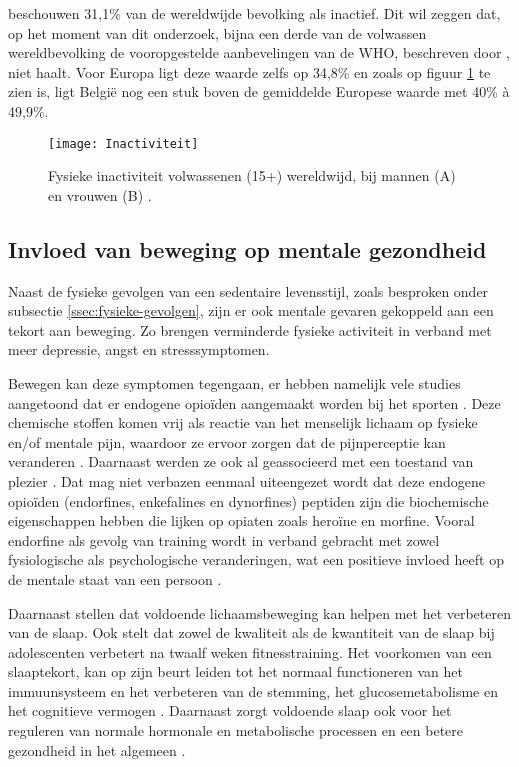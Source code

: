 \textcite{Hallal2012} beschouwen 31,1\% van de wereldwijde bevolking als inactief. Dit wil zeggen dat, op het moment van dit onderzoek, bijna een derde van de volwassen wereldbevolking de vooropgestelde aanbevelingen van de WHO, beschreven door \textcite{Bull2020}, niet haalt. Voor Europa ligt deze waarde zelfs op 34,8\% en zoals op figuur \ref{fig:inactivity} te zien is, ligt België nog een stuk boven de gemiddelde Europese waarde met 40\% à 49,9\%.

\begin{figure}[h]
    \caption[Fysieke inactiviteit bij volwassenen wereldwijd]{Fysieke inactiviteit volwassenen (15+) wereldwijd, bij mannen (A) en vrouwen (B) \autocite{Bull2020}.}
    \texttt{[image: Inactiviteit]}
    \label{fig:inactivity}
\end{figure}

\subsection{Invloed van beweging op mentale gezondheid}
Naast de fysieke gevolgen van een sedentaire levensstijl, zoals besproken onder subsectie \ref{ssec:fysieke-gevolgen}, zijn er ook mentale gevaren gekoppeld aan een tekort aan beweging. Zo brengen \textcite{Stanton2020} verminderde fysieke activiteit in verband met meer depressie, angst en stresssymptomen.

Bewegen kan deze symptomen tegengaan, er hebben namelijk vele studies aangetoond dat er endogene opioïden aangemaakt worden bij het sporten \autocite{Harber1984}. Deze chemische stoffen komen vrij als reactie van het menselijk lichaam op fysieke en/of mentale pijn, waardoor ze ervoor zorgen dat de pijnperceptie kan veranderen \autocite{Chaudhry2023, Dishman2009}. Daarnaast werden ze ook al geassocieerd met een toestand van plezier \autocite{Chaudhry2023}.
Dat mag niet verbazen eenmaal uiteengezet wordt dat deze endogene opioïden (endorfines, enkefalines en dynorfines) peptiden zijn die biochemische eigenschappen hebben die lijken op opiaten zoals heroïne en morfine. Vooral endorfine als gevolg van training wordt in verband gebracht met zowel fysiologische als psychologische veranderingen, wat een positieve invloed heeft op de mentale staat van een persoon \autocite{Dishman2009}.

Daarnaast stellen \textcite{Mahindru2023} dat voldoende lichaamsbeweging kan helpen met het verbeteren van de slaap. Ook \textcite{Ghrouz2019} stelt dat zowel de kwaliteit als de kwantiteit van de slaap bij adolescenten verbetert na twaalf weken fitnesstraining. Het voorkomen van een slaaptekort, kan op zijn beurt leiden tot het normaal functioneren van het immuunsysteem en het verbeteren van de stemming, het glucosemetabolisme en het cognitieve vermogen \autocite{Mahindru2023}. Daarnaast zorgt voldoende slaap ook voor het reguleren van normale hormonale en metabolische processen en een betere gezondheid in het algemeen \autocite{Dolezal2017}.

